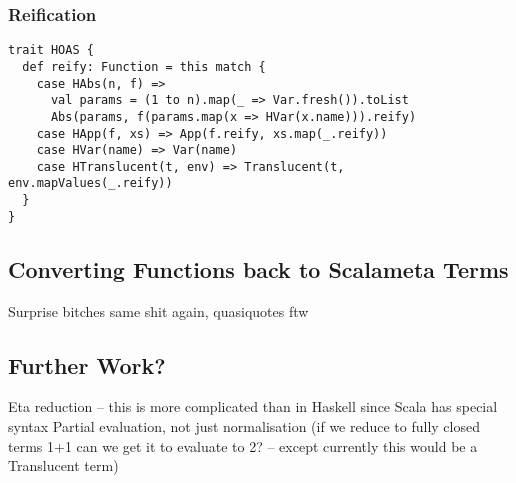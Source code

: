 \documentclass[../../main.tex]{subfiles}
\begin{document}
\subsubsection{Reification}
\begin{verbatim}
trait HOAS {  
  def reify: Function = this match {
    case HAbs(n, f) =>
      val params = (1 to n).map(_ => Var.fresh()).toList
      Abs(params, f(params.map(x => HVar(x.name))).reify)
    case HApp(f, xs) => App(f.reify, xs.map(_.reify))
    case HVar(name) => Var(name)
    case HTranslucent(t, env) => Translucent(t, env.mapValues(_.reify))
  }
}
\end{verbatim}

\subsection{Converting Functions back to Scalameta Terms}
Surprise bitches same shit again, quasiquotes ftw

\subsection{Further Work?}
Eta reduction -- this is more complicated than in Haskell since Scala has special syntax %
Partial evaluation, not just normalisation (if we reduce to fully closed terms 1+1 can we get it to evaluate to 2? -- except currently this would be a Translucent term)
\end{document}

